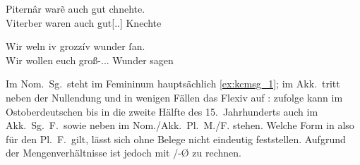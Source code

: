 \begin{exe}
\ex \label{ex:kcmpl}
	\begin{xlist}
	\ex \label{ex:kcmpl_1}
		\gll Piternâr warẽ auch gut chnehte. \\
			Viterber waren auch gut[\Nom.\Pl.\MascM] Knechte \\
		\begin{taggedline}{\parencites[\pno~32\vb, 34]{kc:M}[vgl.][4383]{schroeder1895}}
		\trans {}
		\end{taggedline}

	\ex \label{ex:kcmpl_2}
		\gll Wir weln iv grozzív wunder ſan. \\
			Wir wollen euch groß-\Acc.\Pl.\NeutI.\St{} Wunder sagen \\
		\begin{taggedline}{\parencites[\pno~14\va, 10]{kc:M}[vgl.][1839]{schroeder1895}}
		\trans {}
		\end{taggedline}
	\end{xlist}
\end{exe}

Im Nom.\ Sg.\ steht im Femininum hauptsächlich  \cref{ex:kcmsg_1}; im
Akk.\ tritt neben der Nullendung und  in wenigen Fällen das Flexiv
 auf :
\citet[191--192]{reichmannwegera1993} zufolge kann im Ostoberdeutschen bis in die
zweite Hälfte des 15.~Jahrhunderts  auch im Akk.\ Sg.\ F.\ sowie
 neben  im Nom./Akk.\ Pl.\ M./F. stehen. Welche Form in
\citet{kc:M} also für den Pl.\ F.\ gilt, lässt sich ohne Belege nicht eindeutig
feststellen. Aufgrund der Mengenverhältnisse ist jedoch mit /-Ø zu
rechnen.

